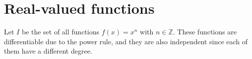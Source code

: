 \section{Real-valued functions}
Let $I$ be the set of all functions $f(x) = x^n$
with $n \in \mathbb{Z}$. 
These functions are differentiable due to the power rule,
and they are also independent since each of them have a different degree.